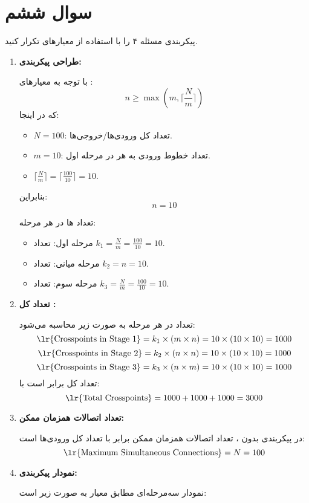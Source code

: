 \section{سوال ششم}


پیکربندی مسئله ۴ را با استفاده از معیارهای  تکرار کنید.


\begin{qsolve}
	\begin{enumerate}[label=\arabic*.]
		\item \textbf{طراحی پیکربندی:}
		
		با توجه به معیارهای :
		\[
		n \geq \max(m, \lceil \frac{N}{m} \rceil)
		\]
		که در اینجا:
		\begin{itemize}
			\item \(N = 100\): تعداد کل ورودی‌ها/خروجی‌ها.
			\item \(m = 10\): تعداد خطوط ورودی به هر  در مرحله اول.
			\item \(\lceil \frac{N}{m} \rceil = \lceil \frac{100}{10} \rceil = 10\).
		\end{itemize}
		بنابراین:
		\[
		n = 10
		\]
		
		تعداد ‌ها در هر مرحله:
		\begin{itemize}
			\item مرحله اول: تعداد \(k_1 = \frac{N}{m} = \frac{100}{10} = 10\).
			\item مرحله میانی: تعداد \(k_2 = n = 10\).
			\item مرحله سوم: تعداد \(k_3 = \frac{N}{m} = \frac{100}{10} = 10\).
		\end{itemize}
		
		\item \textbf{تعداد کل :}
		
		تعداد  در هر مرحله به صورت زیر محاسبه می‌شود:
		\[
		\text{\lr{Crosspoints in Stage 1}} = k_1 \times (m \times n) = 10 \times (10 \times 10) = 1000
		\]
		\[
		\text{\lr{Crosspoints in Stage 2}} = k_2 \times (n \times n) = 10 \times (10 \times 10) = 1000
		\]
		\[
		\text{\lr{Crosspoints in Stage 3}} = k_3 \times (n \times m) = 10 \times (10 \times 10) = 1000
		\]
		تعداد کل  برابر است با:
		\[
		\text{\lr{Total Crosspoints}} = 1000 + 1000 + 1000 = 3000
		\]
		
		\item \textbf{تعداد اتصالات همزمان ممکن:}
		
		در پیکربندی  بدون ، تعداد اتصالات همزمان ممکن برابر با تعداد کل ورودی‌ها است:
		\[
		\text{\lr{Maximum Simultaneous Connections}} = N = 100
		\]
		
		\item \textbf{نمودار پیکربندی:}
		
		نمودار سه‌مرحله‌ای مطابق معیار  به صورت زیر است:
		
	\end{enumerate}
\end{qsolve}
\newpage


